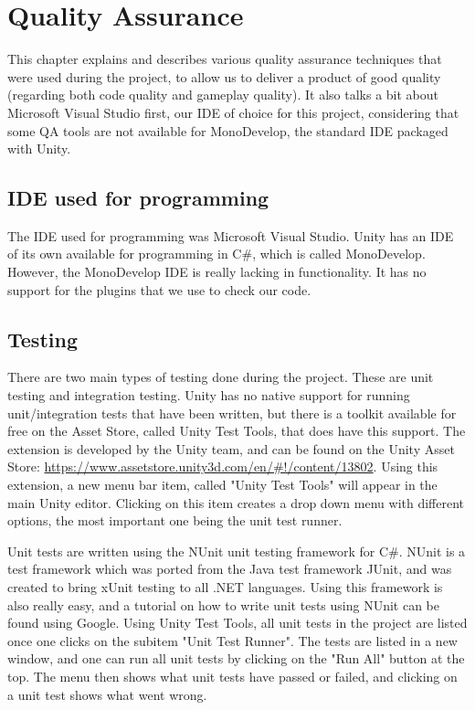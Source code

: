 \chapter{Quality Assurance} \label{cha:qa}
	This chapter explains and describes various quality assurance techniques 
	that were used during the project, to allow us to deliver a product of 
	good quality (regarding both code quality and gameplay quality). It also
	talks a bit about Microsoft Visual Studio first, our IDE of choice for
	this project, considering that some QA tools are not available for
	MonoDevelop, the standard IDE packaged with Unity.
	
	\section{IDE used for programming} \label{sec:ide}
		The IDE used for programming was Microsoft Visual Studio. Unity has an IDE
		of its own available for programming in C\#, which is called MonoDevelop.
		However, the MonoDevelop IDE is really lacking in functionality. It has no
		support for the plugins that we use to check our code. 
	
	\section{Testing} \label{sec:testing}
		There are two main types of testing done during the project. These are
		unit testing and integration testing. Unity has no native support for
		running unit\slash integration tests that have been written, but there is 
		a toolkit available for free on the Asset Store, called Unity Test Tools, 
		that does have this support. The extension is developed by the Unity team, 
		and can be found on the Unity Asset Store: 
		\url{https://www.assetstore.unity3d.com/en/#!/content/13802}.
		Using this extension, a new menu bar item, called "Unity Test Tools"
		will appear in the main Unity editor. Clicking on this item creates a drop
		down menu with different options, the most important one being the unit test
		runner.
		
		Unit tests are written using the NUnit unit testing framework for C\#. NUnit
		is a test framework which was ported from the Java test framework JUnit, and
		was created to bring xUnit testing to all .NET languages. Using this framework
		is also really easy, and a tutorial on how to write unit tests using NUnit
		can be found using Google. Using Unity Test Tools, all unit tests in the
		project are listed once one clicks on the subitem "Unit Test Runner".
		The tests are listed in a new window, and one can run all unit tests by
		clicking on the "Run All" button at the top. The menu then shows what unit tests
		have passed or failed, and clicking on a unit test shows what went wrong.
		
